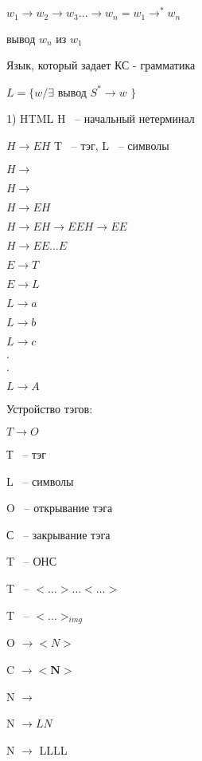 \documentclass[russian]{lecture-notes}
\begin{document}
	$w_{1} \rightarrow w_{2} \rightarrow w_{3} \dots \rightarrow w_{n} = w_{1} \rightarrow^{*} w_{n}$

	вывод $w_{n} $ из $w_{1}$

	\begin{definition}

		Язык, который задает КС - грамматика

		$L = \{ w/ \exists $ вывод $S^{*} \rightarrow w$ $\}$

		\end{definition}

	\begin{example}

		1) HTML \qquad H ~-- начальный нетерминал

		$H \rightarrow EH$ \qquad \qquad \qquad T ~-- тэг, L ~-- символы

		$H \rightarrow$

		$H \rightarrow $

		$H \rightarrow EH$

		$H \rightarrow EH \rightarrow EEH \rightarrow EE$

		$H \rightarrow EE \dots E$

		$E \rightarrow T$

		$E \rightarrow L$

		$L \rightarrow a$

		$L \rightarrow b$

		$L \rightarrow c$

		$.$

		$.$

		$L \rightarrow A$

		\end{example}

	Устройство тэгов:

	$T \rightarrow O$

	Т ~-- тэг

	L ~-- символы

	O ~-- открывание тэга

	С ~-- закрывание тэга

	T ~-- ОНС

	T ~-- $< \dots > \dots <\dots>$

	T ~-- $< \dots >_{img}$

	O $\rightarrow <N>$

	C $\rightarrow <\mathbf{N}>$

	N $\rightarrow$

	N $\rightarrow LN$

	N $\rightarrow$ LLLL
\end{document}

